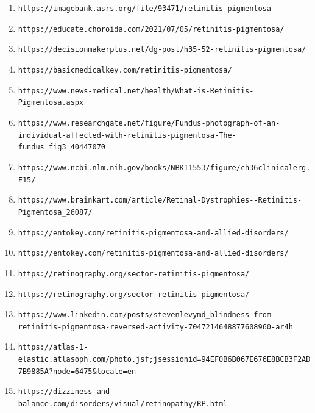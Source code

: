 \documentclass{article}
\begin{document}
	\begin{enumerate}
		\item \nolinkurl{https://imagebank.asrs.org/file/93471/retinitis-pigmentosa}
		
		\item \nolinkurl{https://educate.choroida.com/2021/07/05/retinitis-pigmentosa/}
		
		\item \nolinkurl{https://decisionmakerplus.net/dg-post/h35-52-retinitis-pigmentosa/}
		
		\item \nolinkurl{https://basicmedicalkey.com/retinitis-pigmentosa/}
		
		\item \nolinkurl{https://www.news-medical.net/health/What-is-Retinitis-Pigmentosa.aspx}
		
		\item \nolinkurl{https://www.researchgate.net/figure/Fundus-photograph-of-an-individual-affected-with-retinitis-pigmentosa-The-fundus_fig3_40447070}
		
		\item \nolinkurl{https://www.ncbi.nlm.nih.gov/books/NBK11553/figure/ch36clinicalerg.F15/}
		
		\item \nolinkurl{https://www.brainkart.com/article/Retinal-Dystrophies--Retinitis-Pigmentosa_26087/}
		
		\item \nolinkurl{https://entokey.com/retinitis-pigmentosa-and-allied-disorders/}
		
		\item \nolinkurl{https://entokey.com/retinitis-pigmentosa-and-allied-disorders/}
		
		\item \nolinkurl{https://retinography.org/sector-retinitis-pigmentosa/}
		
		\item \nolinkurl{https://retinography.org/sector-retinitis-pigmentosa/}
		
		\item \nolinkurl{https://www.linkedin.com/posts/stevenlevymd_blindness-from-retinitis-pigmentosa-reversed-activity-7047214648877608960-ar4h}
		
		\item \nolinkurl{https://atlas-1-elastic.atlasoph.com/photo.jsf;jsessionid=94EF0B6B067E676E8BCB3F2AD7B9885A?node=6475&locale=en}
		
		\item \nolinkurl{https://dizziness-and-balance.com/disorders/visual/retinopathy/RP.html}
		

\end{enumerate}
\end{document}
